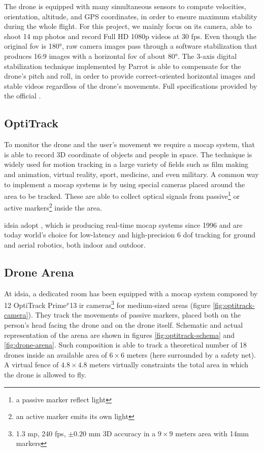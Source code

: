 The drone is equipped with many simultaneous sensors to compute velocities, orientation, altitude, and GPS coordinates, in order to ensure maximum stability during the whole flight. For this project, we mainly focus on its camera, able to shoot 14 \gls{mp} photos and record Full HD 1080p videos at 30 \gls{fps}. Even though the original \gls{fov} is 180°, raw camera images pass through a software stabilization that produces 16:9 images with a horizontal \gls{fov} of about 80°. The 3-axis digital stabilization technique implemented by Parrot is able to compensate for the drone's pitch and roll, in order to provide correct-oriented horizontal images and stable videos regardless of the drone's movements. Full specifications provided by the official \cite{bebop}.



\subsection{OptiTrack}
\label{subsec:optitrack}

To monitor the drone and the user's movement we require a \gls{mocap} system, that is able to record 3D coordinate of objects and people in space. The technique is widely used for motion tracking in a large variety of fields such as film making and animation, virtual reality, sport, medicine, and even military. A common way to implement a \gls{mocap} systems is by using special cameras placed around the area to be tracked. These are able to collect optical signals from passive\footnote{a passive marker reflect light} or active markers\footnote{an active marker emits its own light} inside the area.

\medskip

\gls{idsia} adopt \cite{optitrack}, which is producing real-time \gls{mocap} systems since 1996 and are today world’s choice for low-latency and high-precision 6 \gls{dof} tracking for ground and aerial robotics, both indoor and outdoor.



\subsection{Drone Arena}
\label{subsec:drone-arena}

At \gls{idsia}, a dedicated room has been equipped with a \gls{mocap} system composed by 12 OptiTrack Prime$^x$13 \gls{ir} cameras\footnote{1.3 \gls{mp}, 240 \gls{fps}, $\pm0.20$ mm 3D accuracy in a $9 \times 9$ meters area with 14mm markers} for medium-sized areas (figure \ref{fig:optitrack-camera}). They track the movements of passive markers, placed both on the person's head facing the drone and on the drone itself. Schematic and actual representation of the arena are shown in figures \ref{fig:optitrack-schema} and \ref{fig:drone-arena}. Such composition is able to track a theoretical number of 18 drones inside an available area of $6 \times 6$ meters (here surrounded by a safety net). A virtual fence of $4.8 \times 4.8$ meters virtually constraints the total area in which the drone is allowed to fly.

